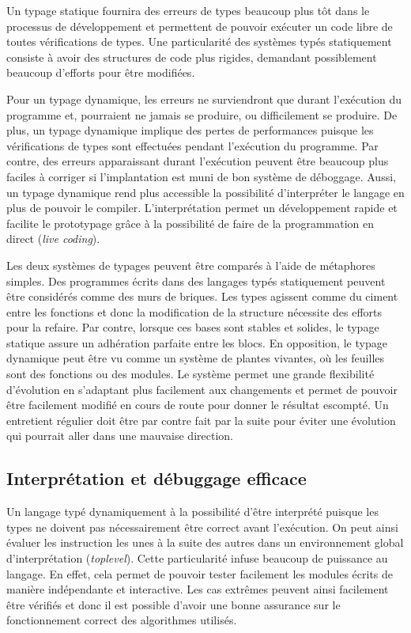 \documentclass[12pt,twoside,letterpaper,francais]{book}
\begin{document}
Un typage statique fournira des erreurs de types beaucoup plus tôt
dans le processus de développement et permettent de pouvoir exécuter
un code libre de toutes vérifications de types. Une particularité des
systèmes typés statiquement consiste à avoir des structures de code
plus rigides, demandant possiblement beaucoup d'efforts pour être
modifiées. 

Pour un typage dynamique, les erreurs ne surviendront que durant
l'exécution du programme et, pourraient ne jamais se produire, ou
difficilement se produire. De plus, un typage dynamique implique des
pertes de performances puisque les vérifications de types sont
effectuées pendant l'exécution du programme. Par contre, des erreurs
apparaissant durant l'exécution peuvent être beaucoup plus faciles à
corriger si l'implantation est muni de bon système de
déboggage. Aussi, un typage dynamique rend plus accessible la
possibilité d'interpréter le langage en plus de pouvoir le
compiler. L'interprétation permet un développement rapide et facilite
le prototypage grâce à la possibilité de faire de la programmation en
direct (\textit{live coding}).

Les deux systèmes de typages peuvent être comparés à l'aide de
métaphores simples. Des programmes écrits dans des langages typés
statiquement peuvent être considérés comme des murs de briques. Les
types agissent comme du ciment entre les fonctions et donc la
modification de la structure nécessite des efforts pour la
refaire. Par contre, lorsque ces bases sont stables et solides, le
typage statique assure un adhération parfaite entre les blocs.  En
opposition, le typage dynamique peut être vu comme un système de
plantes vivantes, où les feuilles sont des fonctions ou des
modules. Le système permet une grande flexibilité d'évolution en
s'adaptant plus facilement aux changements et permet de pouvoir être
facilement modifié en cours de route pour donner le résultat
escompté. Un entretient régulier doit être par contre fait par la
suite pour éviter une évolution qui pourrait aller dans une mauvaise
direction.


\FloatBarrier
\subsection{Interprétation et débuggage efficace}
Un langage typé dynamiquement à la possibilité d'être interprété
puisque les types ne doivent pas nécessairement être correct avant
l'exécution. On peut ainsi évaluer les instruction les unes à la suite
des autres dans un environnement global d'interprétation
(\textit{toplevel}). Cette particularité infuse beaucoup de puissance
au langage. En effet, cela permet de pouvoir tester facilement les
modules écrits de manière indépendante et interactive. Les cas
extrêmes peuvent ainsi facilement être vérifiés et donc il est
possible d'avoir une bonne assurance sur le fonctionnement correct des
algorithmes utilisés.
\end{document}
